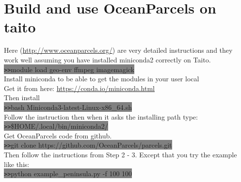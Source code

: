 \documentclass[11pt]{article}
\begin{document}
\section{Build and use OceanParcels on taito}
Here (\url{http://www.oceanparcels.org/}) are very detailed instructions and they work well assuming you have installed miniconda2 correctly on Taito.\\
\colorbox{Grey}{\texttt{>>}module load geo-env ffmpeg imagemagick}\\
Install miniconda to be able to get the modules in your user local\\
Get it from here:
\url{https://conda.io/miniconda.html}\\
Then install \\
\colorbox{Grey}{\texttt{>>}bash Miniconda3-latest-Linux-x86\_64.sh}\\
Follow the instruction then when it asks the installing path type:\\
\colorbox{Grey}{\texttt{>>}\$HOME/.local/bin/miniconda2/}\\
Get OceanParcels code from github.\\
\colorbox{Grey}{\texttt{>>}git clone https://github.com/OceanParcels/parcels.git}\\
Then follow the instructions from Step 2 - 3. Except that you try the example like this:\\
\colorbox{Grey}{\texttt{>>}python example\_peninsula.py -f 100 100}\\
\end{document}

